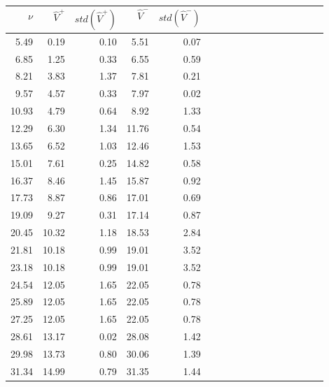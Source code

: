 \documentclass{article}
\begin{document}
\begin{tabular}{rrrrrrrrrrrrrrrrr}\hline 
$\nu$  & $\widehat{V}^+$ & $std(\widehat{V}^+)$ & $\widehat{V}^-$ & $std(\widehat{V}^-)$ \\ \hline 
    5.49 &     0.19 &     0.10 &     5.51  &     0.07 \\ 
    6.85 &     1.25 &     0.33 &     6.55  &     0.59 \\ 
    8.21 &     3.83 &     1.37 &     7.81  &     0.21 \\ 
    9.57 &     4.57 &     0.33 &     7.97  &     0.02 \\ 
   10.93 &     4.79 &     0.64 &     8.92  &     1.33 \\ 
   12.29 &     6.30 &     1.34 &    11.76  &     0.54 \\ 
   13.65 &     6.52 &     1.03 &    12.46  &     1.53 \\ 
   15.01 &     7.61 &     0.25 &    14.82  &     0.58 \\ 
   16.37 &     8.46 &     1.45 &    15.87  &     0.92 \\ 
   17.73 &     8.87 &     0.86 &    17.01  &     0.69 \\ 
   19.09 &     9.27 &     0.31 &    17.14  &     0.87 \\ 
   20.45 &    10.32 &     1.18 &    18.53  &     2.84 \\ 
   21.81 &    10.18 &     0.99 &    19.01  &     3.52 \\ 
   23.18 &    10.18 &     0.99 &    19.01  &     3.52 \\ 
   24.54 &    12.05 &     1.65 &    22.05  &     0.78 \\ 
   25.89 &    12.05 &     1.65 &    22.05  &     0.78 \\ 
   27.25 &    12.05 &     1.65 &    22.05  &     0.78 \\ 
   28.61 &    13.17 &     0.02 &    28.08  &     1.42 \\ 
   29.98 &    13.73 &     0.80 &    30.06  &     1.39 \\ 
   31.34 &    14.99 &     0.79 &    31.35  &     1.44 \\ \hline 
\end{tabular}
\end{document}
